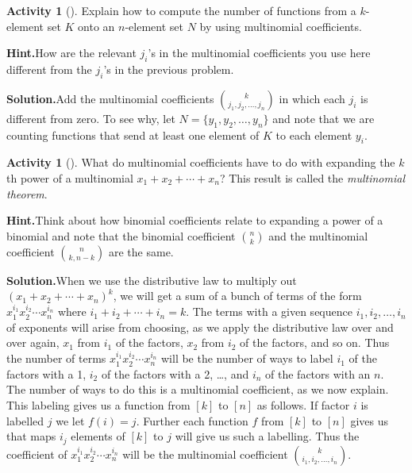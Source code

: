 \documentclass[10pt,]{book}
\theoremstyle{plain}
\theoremstyle{definition}
\newtheorem{activity}[project]{Activity}
\numberwithin{equation}{chapter}
\begin{document}
\begin{activity}[]\label{activity-140}
Explain how to compute the number of functions from a \(k\)-element set \(K\) onto an \(n\)-element set \(N\) by using multinomial coefficients.%
\par\medskip\noindent%
\textbf{Hint.}\quad How are the relevant \(j_i\)'s in the multinomial coefficients you use here different from the \(j_i\)'s in the previous problem.%
\par\medskip\noindent%
\textbf{Solution.}\quad Add the multinomial coefficients \(\binom{k}{j_1,j_2,\ldots,j_n}\) in which each \(j_i\) is different from zero. To see why, let \(N=\{y_1,y_2,\ldots,y_n\}\) and note that we are counting functions that send at least one element of \(K\) to each element \(y_i\).%
\end{activity}
\begin{activity}[]\label{activity-141}
What do multinomial coefficients have to do with expanding the \(k\)th power of a multinomial \(x_1+x_2+\cdots+x_n\)? This result is called the \emph{multinomial theorem}.%
\par\medskip\noindent%
\textbf{Hint.}\quad Think about how binomial coefficients relate to expanding a power of a binomial and note that the binomial coefficient \(\binom{n}{k}\) and the multinomial coefficient \(\binom{n}{k,n-k}\) are the same.%
\par\medskip\noindent%
\textbf{Solution.}\quad When we use the distributive law to multiply out \((x_1+x_2+\cdots +x_n)^k\), we will get a sum of a bunch of terms of the form \(x_1^{i_1}x_2^{i_2}\cdots x_n^{i_n}\) where \(i_1+i_2+\cdots+ i_n=k\).  The terms with a given sequence \(i_1,i_2,\ldots, i_n\) of exponents will arise from choosing, as we apply the distributive law over and over again, \(x_1\) from \(i_1\) of the factors, \(x_2\) from \(i_2\) of the factors, and so on. Thus the number of terms \(x_1^{i_1}x_2^{i_2}\cdots x_n^{i_n}\) will be the number of ways to label \(i_1\) of the factors with a 1, \(i_2\) of the factors with a 2, \dots{}, and \(i_n\) of the factors with an \(n\). The number of ways to do this is a multinomial coefficient, as we now explain. This labeling gives us a function from \([k]\) to \([n]\) as follows. If factor \(i\) is labelled \(j\) we let \(f(i) =j\). Further each function \(f\) from \([k]\) to \([n]\) gives us that maps \(i_j\) elements of \([k]\) to \(j\) will give us such a labelling. Thus the coefficient of \(x_1^{i_1}x_2^{i_2}\cdots x_n^{i_n}\) will be the multinomial coefficient \(\binom{k}{i_1,i_2,\ldots, i_n}\).%
\end{activity}
\typeout{************************************************}
\typeout{************************************************}
\end{document}
